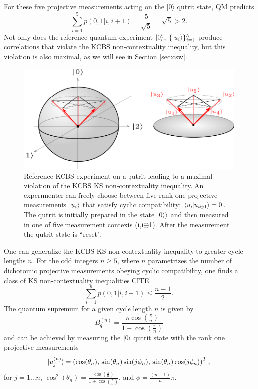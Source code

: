 For these five projective measurements acting on the $\vert 0\rangle$ qutrit state, QM predicts \begin{equation*}
\sum_{i=1}^5p(0,1\vert i, i+1)=\frac{5}{\sqrt{5}}=\sqrt{5}>2.    
\end{equation*}
Not only does the reference quantum experiment $\ket{0}$, $\{\ket{u_i}\}_{i=1}^5$ produce correlations that violate the KCBS non-contextuality inequality, but this violation is also maximal, as we will see in Section \ref{sec:csw}.

\begin{figure}
    \centering
    \includegraphics[width=\textwidth]{images/kcbsref.png}
    \caption{Reference KCBS experiment on a qutrit leading to a maximal violation of the KCBS KS non-contextuality inequality. An experimenter can freely choose between five rank one projective measurements $\ket{u_i}$ that satisfy cyclic compatibility: $\bra{u_i}\ket{ u_{i\oplus1}} = 0$. The qutrit is initially prepared in the state $\ket{0\rangle}$ and then measured in one of five measurement contexts (i,i$\oplus$1). After the measurement the qutrit state is ``reset".}
    \label{fig:kcbsref}
\end{figure}

One can generalize the KCBS KS non-contextuality inequality to greater cycle lengths $n$. For the odd integers $n\geq 5$, where $n$ parametrizes the number of dichotomic projective measurements obeying cyclic compatibility, one finds a class of KS non-contextuality inequalities CITE
\begin{equation}
    \label{eqn:oddncycleclass}
    \sum_{i=1}^n p(0,1\vert i,i+1) \leq \frac{n-1}{2}.
\end{equation}
The quantum supremum for a given cycle length $n$ is given by 
\begin{equation}
\label{eqn:ncyclequsup}
B_q^{(n)}=\frac{n\cos(\frac{\pi}{n})}{1+\cos(\frac{\pi}{n})}
\end{equation} and can be achieved by measuring the $\ket{0}$ qutrit state with the rank one projective measurements
\begin{equation}
\label{eqn:ncycleideal}
\vert u_j^{(n)}\rangle = \left(\cos(\theta_n),\thinspace\sin(\theta_n)\sin(j\phi_n),\thinspace\sin(\theta_n)\cos(j\phi_n)\right)^T,
\end{equation}
for $j=1\dots n$, $\displaystyle\cos^2(\theta_n)=\frac{\cos(\frac{\pi}{n})}{1+\cos(\frac{\pi}{n})}$, and $\displaystyle\phi=\frac{(n-1)}{n}\pi$.


